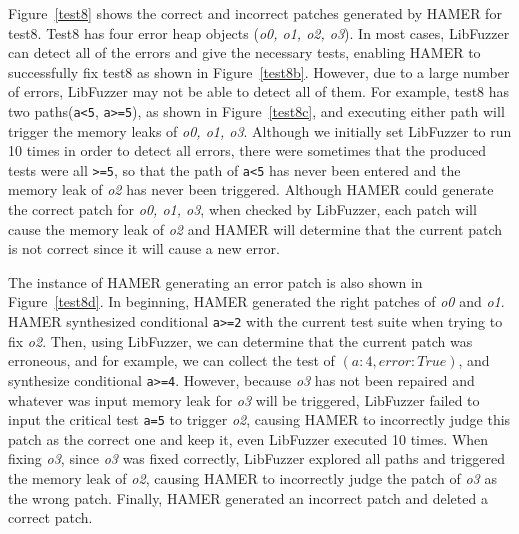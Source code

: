 \documentclass[a4paper,11pt,oneside,openany]{book}
\begin{document}
Figure~\ref{test8} shows the correct and incorrect patches generated by HAMER for test8. Test8 has four error heap objects ({\it o0, o1, o2, o3}). In most cases, LibFuzzer can detect all of the errors and give the necessary tests, enabling HAMER to successfully fix test8 as shown in Figure~\ref{test8b}. However, due to a large number of errors, LibFuzzer may not be able to detect all of them. For example, test8 has two paths(\verb|a<5|, \verb|a>=5|), as shown in Figure~\ref{test8c}, and executing either path will trigger the memory leaks of {\it o0, o1, o3}. Although we initially set LibFuzzer to run 10 times in order to detect all errors, there were sometimes that the produced tests were all \verb|>=5|, so that the path of \verb|a<5| has never been entered and the memory leak of {\it o2} has never been triggered. Although HAMER could generate the correct patch for {\it o0, o1, o3}, when checked by LibFuzzer, each patch will cause the memory leak of {\it o2} and HAMER will determine that the current patch is not correct since it will cause a new error.

The instance of HAMER generating an error patch is also shown in Figure~\ref{test8d}. In beginning, HAMER generated the right patches of {\it o0} and {\it o1}. HAMER synthesized conditional \verb|a>=2| with the current test suite when trying to fix {\it o2}. Then, using LibFuzzer, we can determine that the current patch was erroneous, and for example, we can collect the test of $(a: 4, error: True)$, and synthesize conditional \verb|a>=4|. However, because {\it o3} has not been repaired and whatever was input memory leak for {\it o3} will be triggered, LibFuzzer failed to input the critical test \verb|a=5| to trigger {\it o2}, causing HAMER to incorrectly judge this patch as the correct one and keep it, even LibFuzzer executed 10 times. When fixing {\it o3}, since {\it o3} was fixed correctly, LibFuzzer explored all paths and triggered the memory leak of {\it o2}, causing HAMER to incorrectly judge the patch of {\it o3} as the wrong patch. Finally, HAMER generated an incorrect patch and deleted a correct patch.

\vspace{0.4cm}
\hspace{-0.7cm}
\end{document}
